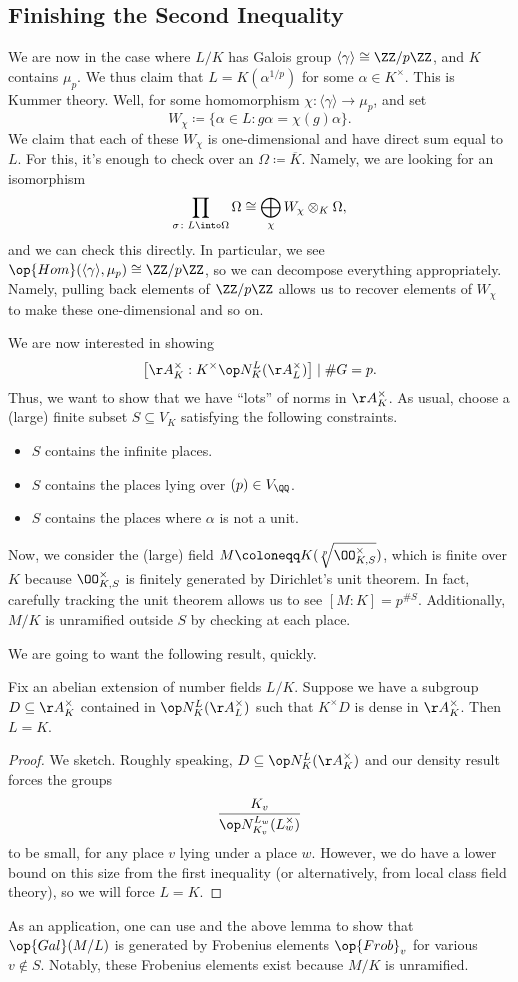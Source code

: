 \documentclass[../notes.tex]{subfiles}
\begin{document}
\subsection{Finishing the Second Inequality}
We are now in the case where $L/K$ has Galois group $\langle\gamma\rangle\cong\ZZ/p\ZZ$, and $K$ contains $\mu_p$. We thus claim that $L=K(\alpha^{1/p})$ for some $\alpha\in K^\times$. This is Kummer theory. Well, for some homomorphism $\chi\colon\langle\gamma\rangle\to\mu_p$, and set
\[W_\chi\coloneqq\{\alpha\in L:g\alpha=\chi(g)\alpha\}.\]
We claim that each of these $W_\chi$ is one-dimensional and have direct sum equal to $L$. For this, it's enough to check over an $\Omega\coloneqq\overline K$. Namely, we are looking for an isomorphism
\[\prod_{\sigma\colon L\into\Omega}\Omega\cong\bigoplus_\chi W_\chi\otimes_K\Omega,\]
and we can check this directly. In particular, we see $\op{Hom}(\langle\gamma\rangle,\mu_p)\cong\ZZ/p\ZZ$, so we can decompose everything appropriately. Namely, pulling back elements of $\ZZ/p\ZZ$ allows us to recover elements of $W_\chi$ to make these one-dimensional and so on.

We are now interested in showing
\[\left[\AA_K^\times:K^\times\op N^L_K(\AA_L^\times)\right]\mid\#G=p.\]
Thus, we want to show that we have ``lots'' of norms in $\AA_K^\times$. As usual, choose a (large) finite subset $S\subseteq V_K$ satisfying the following constraints.
\begin{itemize}
	\item $S$ contains the infinite places.
	\item $S$ contains the places lying over $(p)\in V_\QQ$.
	\item $S$ contains the places where $\alpha$ is not a unit.
\end{itemize}
Now, we consider the (large) field $M\coloneqq K(\sqrt[p]{\OO_{K,S}^\times})$, which is finite over $K$ because $\OO_{K,S}^\times$ is finitely generated by Dirichlet's unit theorem. In fact, carefully tracking the unit theorem allows us to see $[M:K]=p^{\#S}$. Additionally, $M/K$ is unramified outside $S$ by checking at each place.

We are going to want the following result, quickly.
\begin{lemma}
	Fix an abelian extension of number fields $L/K$. Suppose we have a subgroup $D\subseteq\AA_K^\times$ contained in $\op N^L_K(\AA_L^\times)$ such that $K^\times D$ is dense in $\AA_K^\times$. Then $L=K$.
\end{lemma}
\begin{proof}
	We sketch. Roughly speaking, $D\subseteq\op N^L_K(\AA_K^\times)$ and our density result forces the groups
	\[\frac{K_v}{\op N^{L_w}_{K_v}(L_w^\times)}\]
	to be small, for any place $v$ lying under a place $w$. However, we do have a lower bound on this size from the first inequality (or alternatively, from local class field theory), so we will force $L=K$.
\end{proof}
As an application, one can use  and the above lemma to show that $\op{Gal}(M/L)$ is generated by Frobenius elements $\op{Frob}_v$ for various $v\notin S$. Notably, these Frobenius elements exist because $M/K$ is unramified.
\end{document}
